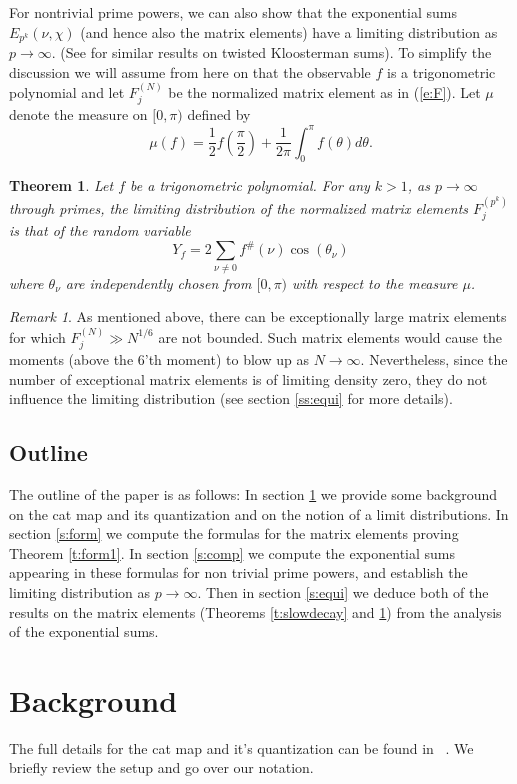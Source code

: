 \documentclass[12pt]{amsart}
\newtheorem{thm}{Theorem}%
\theoremstyle{definition}
\theoremstyle{remark}
\newtheorem{rem}{Remark}[section]
\numberwithin{equation}{section}
\begin{document}
For nontrivial prime powers, we can also show that the exponential
sums $E_{p^k}(\nu,\chi)$ (and hence also the matrix elements) have a
limiting distribution as $p\to\infty$. (See \cite{KelmerSums08} for
similar results on twisted Kloosterman sums). To simplify the
discussion we will assume from here on that the observable $f$ is a
trigonometric polynomial and let $F_j^{(N)}$ be the normalized
matrix element as in (\ref{e:F}). Let $\mu$ denote the measure on
$[0,\pi)$ defined by
\begin{equation*}
\mu(f)=\frac{1}{2}f(\frac{\pi}{2})+\frac{1}{2\pi}\int_0^{\pi}f(\theta)d\theta.
\end{equation*}

\begin{thm}\label{t:main}
Let $f$ be a trigonometric polynomial. For any $k>1$, as $p\to
\infty$ through primes, the limiting distribution of the normalized
matrix elements $F_j^{(p^k)}$ is that of the random variable
\[Y_f=2\sum_{\nu\neq 0}f^\#(\nu)\cos(\theta_\nu)\]
where $\theta_\nu$ are independently chosen from $[0,\pi)$ with
respect to the measure $\mu$.
\end{thm}
\begin{rem}
As mentioned above, there can be exceptionally large matrix elements
for which $F_j^{(N)}\gg N^{1/6}$ are not bounded. Such matrix
elements would cause the moments (above the $6$'th moment) to blow
up as $N\to\infty$. Nevertheless, since the number of exceptional
matrix elements is of limiting density zero, they do not influence
the limiting distribution (see section \ref{ss:equi} for more
details).
\end{rem}
\subsection{Outline}
The outline of the paper is as follows: In section \ref{s:BKG} we
provide some background on the cat map and its quantization and on
the notion of a limit distributions. In section \ref{s:form} we
compute the formulas for the matrix elements proving Theorem
\ref{t:form1}. In section \ref{s:comp} we compute the exponential
sums appearing in these formulas for non trivial prime powers, and
establish the limiting distribution as $p\to\infty$. Then in section
\ref{s:equi} we deduce both of the results on the matrix elements
(Theorems \ref{t:slowdecay} and \ref{t:main}) from the analysis of
the exponential sums.
\section{Background}\label{s:BKG}
The full details for the cat map and it's quantization can be found
in ~\cite{KurRud2000}. We briefly review the setup and go over our
notation.
\end{document}
